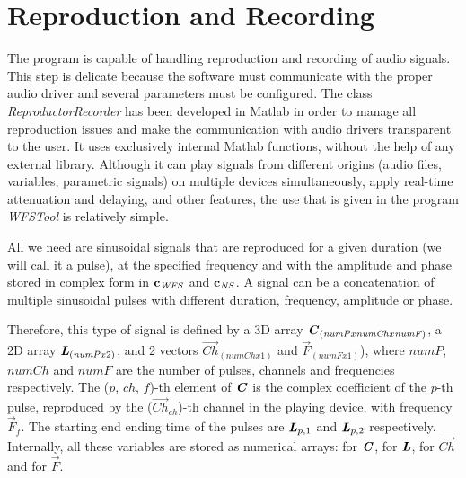 \section{Reproduction and Recording}
The program is capable of handling reproduction and recording of audio signals. This step is delicate because the software must communicate with the proper audio driver and several parameters must be configured. The class \textit{ReproductorRecorder} has been developed in Matlab in order to manage all reproduction issues and make the communication with audio drivers transparent to the user. It uses exclusively internal Matlab functions, without the help of any external library. Although it can play signals from different origins (audio files, variables, parametric signals) on multiple devices simultaneously, apply real-time attenuation and delaying, and other features, the use that is given in the program \textit{WFSTool} is relatively simple.

All we need are sinusoidal signals that are reproduced for a given duration (we will call it a pulse), at the specified frequency and with the amplitude and phase stored in complex form in $\coef[vec][WFS]$ and $\coef[vec][NS]$. A signal can be a concatenation of multiple sinusoidal pulses with different duration, frequency, amplitude or phase.


Therefore, this type of signal is defined by a 3D array $\bm{\mathit{C}}_{(\mathit{numP} x \mathit{numCh} x \mathit{numF})}$, a 2D array $\bm{\mathit{L}}_{(\mathit{numP} x 2)}$, and 2 vectors $\vec{Ch}_{(\mathit{numCh} x 1)}$ and $\vec{F}_{(\mathit{numF} x 1)}$), where $\mathit{numP}$, $\mathit{numCh}$ and $\mathit{numF}$ are the number of pulses, channels and frequencies respectively. The ($p$, $ch$, $f$)-th element of $\bm{\mathit{C}}$ is the complex coefficient of the $p$-th pulse, reproduced by the ($\vec{Ch}_{\mathit{ch}}$)-th channel in the playing device, with frequency $\vec{F}_f$. The starting end ending time of the pulses are $\bm{\mathit{L}}_{p, 1}$ and $\bm{\mathit{L}}_{p, 2}$ respectively. Internally, all these variables are stored as numerical arrays:  for $\bm{\mathit{C}}$,  for $\bm{\mathit{L}}$,  for $\vec{Ch}$ and  for $\vec{F}$.


